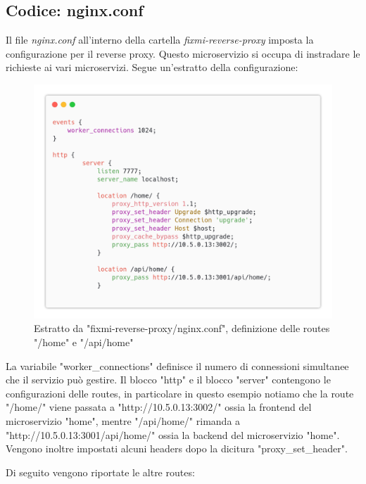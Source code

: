 \documentclass{report}
\begin{document}
\subsection{Codice: nginx.conf}

Il file \textit{nginx.conf} all'interno della cartella \textit{fixmi-reverse-proxy} imposta la configurazione per il reverse proxy. Questo microservizio si occupa di instradare le richieste ai vari microservizi. Segue un'estratto della configurazione:


\begin{figure}[H]
	\centering\includegraphics[width=1\textwidth]{images/nginx_config_home.png}
	Estratto da "fixmi-reverse-proxy/nginx.conf", definizione delle routes "/home" e "/api/home"
\end{figure}

La variabile "worker\_connections" definisce il numero di connessioni simultanee che il servizio può gestire. Il blocco "http" e il blocco "server" contengono le configurazioni delle routes, in particolare in questo esempio notiamo che la route "/home/" viene passata a "http://10.5.0.13:3002/" ossia la frontend del microservizio "home", mentre "/api/home/" rimanda a "http://10.5.0.13:3001/api/home/" ossia la backend del microservizio "home". Vengono inoltre impostati alcuni headers dopo la dicitura "proxy\_set\_header".

Di seguito vengono riportate le altre routes:
\end{document}
